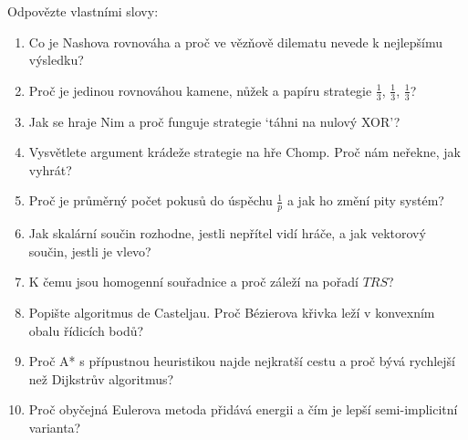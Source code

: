 \begin{problem}
  Odpovězte vlastními slovy:
  \begin{enumerate}
    \item Co je Nashova rovnováha a proč ve vězňově dilematu nevede k nejlepšímu výsledku?
    \item Proč je jedinou rovnováhou kamene, nůžek a papíru strategie $\frac{1}{3}$, $\frac{1}{3}$, $\frac{1}{3}$?
    \item Jak se hraje Nim a proč funguje strategie `táhni na nulový XOR'?
    \item Vysvětlete argument krádeže strategie na hře Chomp. Proč nám neřekne, jak vyhrát?
    \item Proč je průměrný počet pokusů do úspěchu $\frac{1}{p}$ a jak ho změní pity systém?
    \item Jak skalární součin rozhodne, jestli nepřítel vidí hráče, a jak vektorový součin, jestli je vlevo?
    \item K čemu jsou homogenní souřadnice a proč záleží na pořadí $TRS$?
    \item Popište algoritmus de Casteljau. Proč Bézierova křivka leží v konvexním obalu řídicích bodů?
    \item Proč A* s přípustnou heuristikou najde nejkratší cestu a proč bývá rychlejší než Dijkstrův algoritmus?
    \item Proč obyčejná Eulerova metoda přidává energii a čím je lepší semi-implicitní varianta?
  \end{enumerate}
\end{problem}
